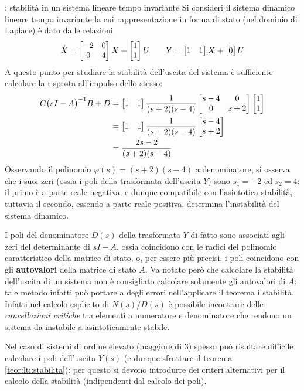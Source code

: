 	\begin{esempio}{: stabilità in un sistema lineare tempo invariante} 
		Si consideri il sistema dinamico lineare tempo invariante la cui rappresentazione in forma di stato (nel dominio di Laplace) è dato dalle relazioni
		\[ \dot X= \begin{bmatrix} -2 & 0 \\ 0 & 4 \end{bmatrix} X + \begin{bmatrix} 1 \\ 1 \end{bmatrix}U \qquad Y = \begin{bmatrix} 1 & 1 \end{bmatrix} X + \begin{bmatrix} 0 \end{bmatrix}U \]
		A questo punto per studiare la stabilità dell'uscita del sistema è sufficiente calcolare la risposta all'impulso dello stesso:
		\begin{align*}
			C\big(sI-A\big)^{-1} B + D & = \begin{bmatrix} 1 & 1 \end{bmatrix} \frac 1 {(s+2)(s-4)} \begin{bmatrix} s-4 &0 \\ 0 & s+2  \end{bmatrix}\begin{bmatrix} 1 \\ 1 \end{bmatrix} \\
			& = \begin{bmatrix} 1 & 1 \end{bmatrix} \frac 1 {(s+2)(s-4)} \begin{bmatrix} s-4 \\ s+2 \end{bmatrix} \\
			&= \frac{2s-2}{(s+2)(s-4)}
		\end{align*}
		Osservando il polinomio $\varphi(s) =(s+2)(s-4)$ a denominatore, si osserva che i suoi zeri (ossia i poli della trasformata dell'uscita $Y$) sono $s_1 = -2$ ed $s_2 = 4$: il primo è a parte reale negativa, e dunque compatibile con l'asintotica stabilità, tuttavia il secondo, essendo a parte reale positiva, determina l'instabilità del sistema dinamico.
	\end{esempio}
	
	\begin{osservazione}
		I poli del denominatore $D(s)$ della trasformata $Y$ di fatto sono associati agli zeri del determinante di $sI-A$, ossia coincidono con le radici del polinomio caratteristico della matrice di stato, o, per essere più precisi, i poli coincidono con gli \textbf{autovalori} della matrice di stato $A$. Va notato però che calcolare la stabilità dell'uscita di un sistema non è consigliato calcolare solamente gli autovalori di $A$: tale metodo infatti può portare a degli errori nell'applicare il teorema i stabilità. Infatti nel calcolo esplicito di $N(s)/D(s)$ è possibile incontrare delle \textit{cancellazioni critiche} tra elementi a numeratore e denominatore che rendono un sistema da instabile a asintoticamente stabile.
	\end{osservazione}
	Nel caso di sistemi di ordine elevato (maggiore di 3) spesso può risultare difficile calcolare i poli dell'uscita $Y(s)$ (e dunque sfruttare il teorema \ref{teor:lti:stabilita}): per questo si devono introdurre dei criteri alternativi per il calcolo della stabilità (indipendenti dal calcolo dei poli).
	
